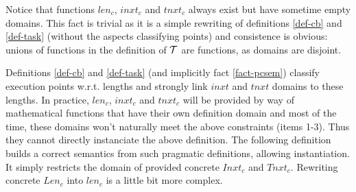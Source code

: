 \documentclass{article}
\begin{document}
Notice that functions $len_c$, $inxt_c$ and $tnxt_c$ always exist but have sometime empty domains. This fact is trivial as it is a simple rewriting of definitions \ref{def-cb} and \ref{def-task} (without the aspects classifying points) and consistence is obvious: unions of functions in the definition of ${\cal T}$ are  functions, as domains are disjoint. 

Definitions \ref{def-cb} and \ref{def-task} (and implicitly fact \ref{fact-pcsem}) classify execution points w.r.t. lengths and strongly link $inxt$ and $tnxt$ domains to these lengths. In practice, $len_c$, $inxt_c$ and $tnxt_c$ will be provided by way of mathematical functions that have their own definition domain and most of the time, these domains won't naturally meet the above constraints (items 1-3). Thus they cannot directly instanciate the above definition. The following definition builds a correct semantics from such pragmatic definitions, allowing instantiation. It simply restricts the domain of provided concrete $Inxt_c$ and $T\!nxt_c$. Rewriting concrete $Len_c$ into $len_c$ is a little bit more complex.
\end{document}
